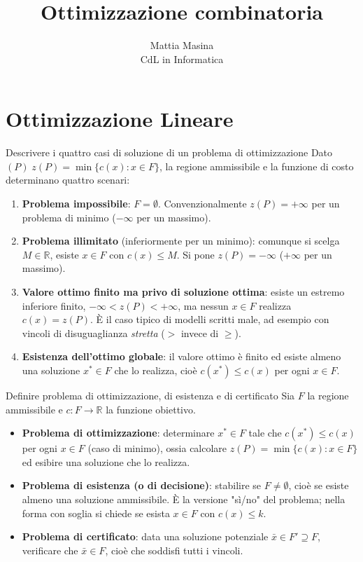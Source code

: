 \documentclass[12pt]{extarticle} %
\title{Ottimizzazione combinatoria}
\author{Mattia Masina\\CdL in Informatica}
\date{}
\begin{document}
\section{Ottimizzazione Lineare}

\begin{teoriabox}{Descrivere i quattro casi di soluzione di un problema di ottimizzazione}
Dato $(P) \; z(P) = \min\{c(x) : x \in F\}$, la regione ammissibile e la funzione di costo determinano quattro scenari:
\begin{enumerate}
    \item \textbf{Problema impossibile}: $F = \emptyset$. Convenzionalmente $z(P) = +\infty$ per un problema di minimo ($-\infty$ per un massimo).
    \item \textbf{Problema illimitato} (inferiormente per un minimo): comunque si scelga $M \in \mathbb{R}$, esiste $x \in F$ con $c(x) \le M$. Si pone $z(P) = -\infty$ ($+\infty$ per un massimo).
    \item \textbf{Valore ottimo finito ma privo di soluzione ottima}: esiste un estremo inferiore finito, $-\infty < z(P) < +\infty$, ma nessun $x \in F$ realizza $c(x) = z(P)$. È il caso tipico di modelli scritti male, ad esempio con vincoli di disuguaglianza \textit{stretta} ($>$ invece di $\ge$).
    \item \textbf{Esistenza dell'ottimo globale}: il valore ottimo è finito ed esiste almeno una soluzione $x^* \in F$ che lo realizza, cioè $c(x^*) \le c(x)$ per ogni $x \in F$.
\end{enumerate}
\end{teoriabox}

\begin{teoriabox}{Definire problema di ottimizzazione, di esistenza e di certificato}
Sia $F$ la regione ammissibile e $c: F \to \mathbb{R}$ la funzione obiettivo.
\begin{itemize}
    \item \textbf{Problema di ottimizzazione}: determinare $x^* \in F$ tale che $c(x^*) \le c(x)$ per ogni $x \in F$ (caso di minimo), ossia calcolare $z(P) = \min\{c(x) : x \in F\}$ ed esibire una soluzione che lo realizza.
    \item \textbf{Problema di esistenza (o di decisione)}: stabilire se $F \ne \emptyset$, cioè se esiste almeno una soluzione ammissibile. È la versione "sì/no" del problema; nella forma con soglia si chiede se esista $x \in F$ con $c(x) \le k$.
    \item \textbf{Problema di certificato}: data una soluzione potenziale $\bar{x} \in F' \supseteq F$, verificare che $\bar{x} \in F$, cioè che soddisfi tutti i vincoli.
\end{itemize}
\end{teoriabox}
\end{document}
